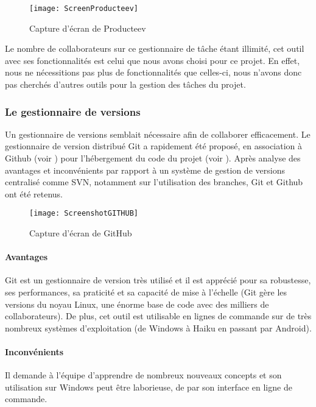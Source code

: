 \begin{figure}[ht]
\centering
\texttt{[image: ScreenProducteev]}
\caption{Capture d'écran de Producteev}
\label{fig:ScreenProducteev}
\end{figure}

Le nombre de collaborateurs sur ce gestionnaire de tâche étant illimité, cet outil avec ses fonctionnalités est celui que nous avons choisi pour ce projet. En effet, nous ne nécessitions pas plus de fonctionnalités que celles-ci, nous n'avons donc pas cherchés d'autres outils pour la gestion des tâches du projet.

\subsubsection{Le gestionnaire de versions}

Un gestionnaire de versions semblait nécessaire afin de collaborer efficacement. Le gestionnaire de version distribué Git a rapidement été proposé, en association à Github (voir \cite{github}) pour l'hébergement du code du projet (voir \cite{progit}).
Après analyse des avantages et inconvénients par rapport à un système de gestion de versions centralisé comme SVN, notamment sur l'utilisation des branches, Git et Github ont été retenus.

\begin{figure}[ht]
\centering
\texttt{[image: ScreenshotGITHUB]}
\caption{Capture d'écran de GitHub}
\label{fig:ScreenGitHub}
\end{figure}

\paragraph{Avantages}
Git est un gestionnaire de version très utilisé et il est apprécié pour sa robustesse, ses performances, sa praticité et sa capacité de mise à l'échelle (Git gère les versions du noyau Linux, une énorme base de code avec des milliers de collaborateurs).
De plus, cet outil est utilisable en lignes de commande sur de très nombreux systèmes d'exploitation (de Windows à Haiku en passant par Android).

\paragraph{Inconvénients}
Il demande à l'équipe d'apprendre de nombreux nouveaux concepts et son utilisation sur Windows peut être laborieuse, de par son interface en ligne de commande.

